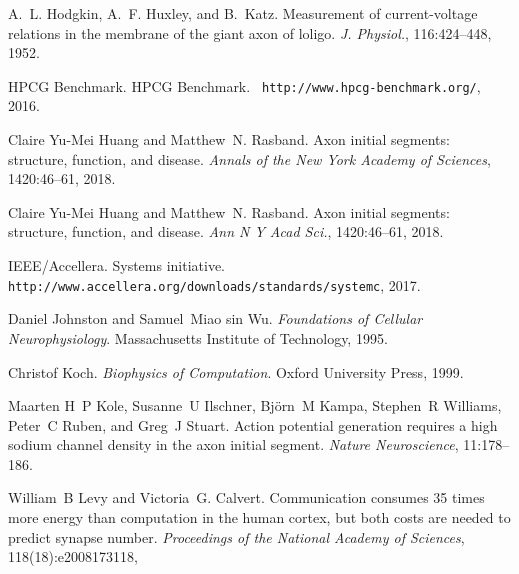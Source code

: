 \begin{DoxyDescription}
\item[\label{citelist_CITEREF_HodgkinHuxleyCurrentVoltage:1952}%
\mbox{[}26\mbox{]}]A.~L. Hodgkin, A.~F. Huxley, and B.~Katz. Measurement of current-\/voltage relations in the membrane of the giant axon of loligo. {\itshape J. Physiol.}, 116\+:424--448, 1952.


\item[\label{citelist_CITEREF_HPCG_List:2016}%
\mbox{[}27\mbox{]}]HPCG Benchmark. HPCG Benchmark. {\texttt{ http\+://www.\+hpcg-\/benchmark.\+org/}}, 2016.


\item[\label{citelist_CITEREF_AISStructureReview:2018}%
\mbox{[}28\mbox{]}]Claire Yu-\/\+Mei Huang and Matthew~N. Rasband. Axon initial segments\+: structure, function, and disease. {\itshape Annals of the New York Academy of Sciences}, 1420\+:46--61, 2018. 


\item[\label{citelist_CITEREF_AxonInitialSegmentStructure:2018}%
\mbox{[}29\mbox{]}]Claire Yu-\/\+Mei Huang and Matthew~N. Rasband. Axon initial segments\+: structure, function, and disease. {\itshape Ann N Y Acad Sci.}, 1420\+:46–61, 2018. 


\item[\label{citelist_CITEREF_SystemChome:2017}%
\mbox{[}30\mbox{]}]IEEE/\+Accellera. Systems initiative. {\texttt{ http\+://www.\+accellera.\+org/downloads/standards/systemc}}, 2017.


\item[\label{citelist_CITEREF_JohstonWuNeurophysiology:1995}%
\mbox{[}31\mbox{]}]Daniel Johnston and Samuel~Miao sin Wu. {\itshape Foundations of Cellular Neurophysiology}. Massachusetts Institute of Technology, 1995.


\item[\label{citelist_CITEREF_KochBiophysics:1999}%
\mbox{[}32\mbox{]}]Christof Koch. {\itshape Biophysics of Computation}. Oxford University Press, 1999.


\item[\label{citelist_CITEREF_ActionPotentialGenerationNatrium:2008}%
\mbox{[}33\mbox{]}]Maarten H~P Kole, Susanne~U Ilschner, Bj\"{o}rn~M Kampa, Stephen~R Williams, Peter~C Ruben, and Greg~J Stuart. Action potential generation requires a high sodium channel density in the axon initial segment. {\itshape Nature Neuroscience}, 11\+:178--186. 


\item[\label{citelist_CITEREF_EnergyNeuralCommunication:2021}%
\mbox{[}34\mbox{]}]William~B Levy and Victoria~G. Calvert. Communication consumes 35 times more energy than computation in the human cortex, but both costs are needed to predict synapse number. {\itshape Proceedings of the National Academy of Sciences}, 118(18)\+:e2008173118,
\begin{DoxyEnumerate}
\item 
\end{DoxyEnumerate}



\end{DoxyDescription}
